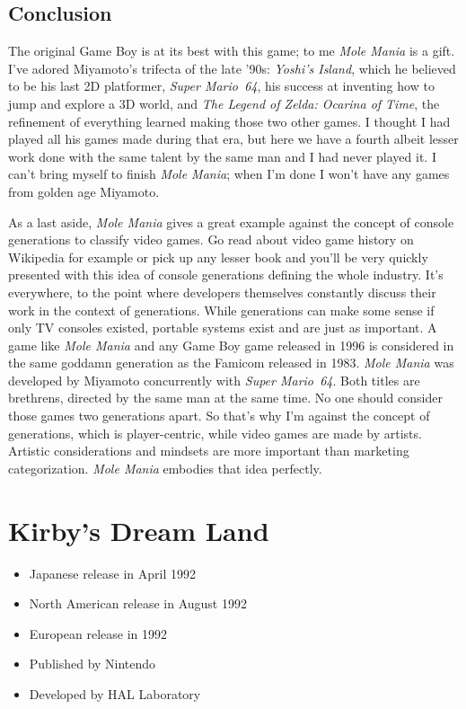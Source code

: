 \documentclass{book}
\begin{document}
\FloatBarrier\needspace{5pt}\section*{Conclusion}\nopagebreak[4]
The original Game Boy is at its best with this game; to me \emph{Mole Mania} is a gift. I’ve adored Miyamoto’s trifecta of the late ’90s: \emph{Yoshi’s Island}, which he believed to be his last 2D platformer, \emph{Super Mario 64}, his success at inventing how to jump and explore a 3D world, and \emph{The Legend of Zelda: Ocarina of Time}, the refinement of everything learned making those two other games. I thought I had played all his games made during that era, but here we have a fourth albeit lesser work done with the same talent by the same man and I had never played it. I can’t bring myself to finish \emph{Mole Mania}; when I’m done I won’t have any games from golden age Miyamoto.

As a last aside, \emph{Mole Mania} gives a great example against the concept of console generations to classify video games. Go read about video game history on Wikipedia for example or pick up any lesser book and you’ll be very quickly presented with this idea of console generations defining the whole industry. It’s everywhere, to the point where developers themselves constantly discuss their work in the context of generations. While generations can make some sense if only TV consoles existed, portable systems exist and are just as important. A game like \emph{Mole Mania} and any Game Boy game released in 1996 is considered in the same goddamn generation as the Famicom released in 1983. \emph{Mole Mania} was developed by Miyamoto concurrently with \emph{Super Mario 64}. Both titles are brethrens, directed by the same man at the same time. No one should consider those games two generations apart. So that’s why I’m against the concept of generations, which is player-centric, while video games are made by artists. Artistic considerations and mindsets are more important than marketing categorization. \emph{Mole Mania} embodies that idea perfectly.


\begingroup \chapter*{Kirby’s Dream Land} \endgroup

\begin{itemize} \setlength\itemsep{-0.4em}
\item Japanese release in April 1992
\item North American release in August 1992
\item European release in 1992
\item Published by Nintendo
\item Developed by HAL Laboratory
\end{itemize}\noindent
\end{document}
